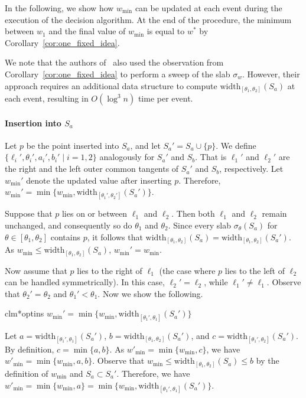 \documentclass[10pt,a4paper]{article}
\makeatletter
\newenvironment{claimproof}[1][\proofname]{%
  \pushQED{\qed}%
  \normalfont \topsep6\p@\@plus6\p@\relax
  \trivlist
  \item[\hskip\labelsep\color{lipicsGray}\sffamily #1\@addpunct{.}]\ignorespaces
}{%
  \renewcommand\qedsymbol{\textcolor{lipicsGray}{\ensuremath{\vartriangleleft}}}%
  \popQED\endtrivlist
  \renewcommand\qedsymbol{\textcolor{lipicsGray}{\ensuremath{\blacktriangleleft}}}%
}
\theoremstyle{star}
\theoremstyle{claimstar}
\newcommand{\width}{\ensuremath{\mathrm{width}}}
\makeatother
\begin{document}
In the following, we show how $w_{\min}$ can be updated at each event during the execution of the decision algorithm.
At the end of the procedure, the minimum between $w_1$ and the final value of $w_{\min}$ is equal to $w^*$ by Corollary~\ref{cor:one_fixed_idea}. 



We note that the authors of~\cite{ahn2024constrained} also used the observation from Corollary~\ref{cor:one_fixed_idea} to perform a sweep of the slab $\sigma_w$.
However, their approach requires an additional data structure to compute $\width_{[\theta_1, \theta_2]}(S_a)$ at each event, resulting in $O(\log^3 n)$ time per event.


\paragraph*{Insertion into $S_a$}
Let $p$ be the point inserted into $S_a$, and let $S_a' = S_a \cup \{p\}$.
We define $\{\ell_i', \theta_i', a_i', b_i' \mid i=1, 2 \}$ analogously for $S_a'$ and $S_b$. 
That is $\ell_1'$ and $\ell_2'$ are the right and the left outer common tangents of $S_a'$ and $S_b$, respectively. 
Let $w_{\min}'$ denote the updated value after inserting $p$.
Therefore, $w_{\min}' = \min \{w_{\min}, \width_{[\theta_1', \theta_2']}(S_a')\}$.


Suppose that $p$ lies on or between $\ell_1$ and $\ell_2$. 
Then both $\ell_1$ and $\ell_2$ remain unchanged, and consequently so do $\theta_1$ and $\theta_2$.
Since every slab $\sigma_\theta(S_a)$ for $\theta \in [\theta_1, \theta_2]$ contains $p$, it follows that $\width_{[\theta_1, \theta_2]}(S_a) = \width_{[\theta_1, \theta_2]}(S_a')$. 
As $w_{\min} \le \width_{[\theta_1, \theta_2]}(S_a)$, $w_{\min}' = w_{\min}$. 

Now assume that $p$ lies to the right of $\ell_1$ (the case where $p$ lies to the left of $\ell_2$ can be handled symmetrically).
In this case, $\ell_2' = \ell_2$, while $\ell_1' \neq \ell_1$.
Observe that $\theta_2' = \theta_2$ and $\theta_1' < \theta_1$.
Now we show the following. 

\begin{restatable}{clm*}{optins}
    \label{claim:opt_ins}
    $w_{\min}' = \min \{w_{\min}, \width_{[\theta_1', \theta_1]}(S_a') \}$
\end{restatable}



\begin{claimproof}
    Let $a = \width_{[\theta_1', \theta_1]}(S_a')$, 
    $b = \width_{[\theta_1, \theta_2]}(S_a')$, and
    $c = \width_{[\theta_1', \theta_2]}(S_a')$. 
    By definition, $c = \min \{ a, b\}$. 
    As $w'_{\min} = \min \{w_{\min}, c \}$, 
    we have $w'_{\min} = \min \{w_{\min}, a, b \}$. 
    Observe that $w_{\min} \le  \width_{[\theta_1, \theta_2]}(S_a) \le b$ by the definition of $w_{\min}$ and $S_a \subset S_a'$. 
    Therefore, we have $w'_{\min} = \min \{w_{\min}, a \} =  \min \{w_{\min}, \width_{[\theta_1', \theta_1]}(S_a')\}$.
\end{claimproof}
\end{document}
